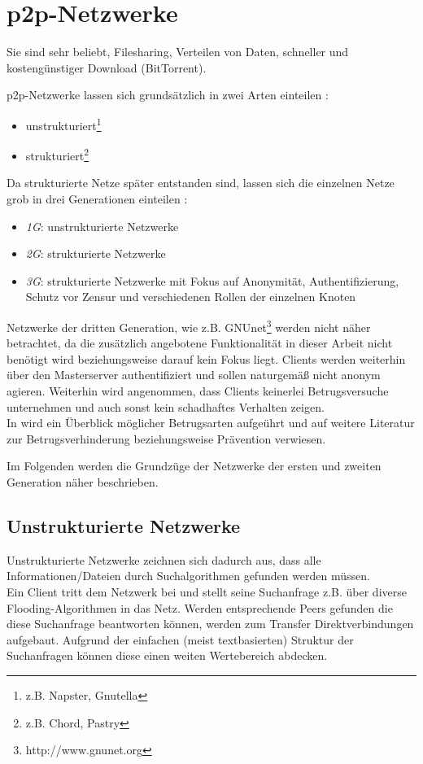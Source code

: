 \section{p2p-Netzwerke}
\label{chap:grundlagen:p2p}
Sie sind sehr beliebt, Filesharing, Verteilen von Daten, schneller und kostengünstiger Download (BitTorrent).

p2p-Netzwerke lassen sich grundsätzlich in zwei Arten einteilen \cite{Steinmetz2005, Lua2005Survey}: 
\begin{itemize}
\item unstrukturiert\footnote{z.B. Napster, Gnutella}
\item strukturiert\footnote{z.B. Chord, Pastry}
\end{itemize}

Da strukturierte Netze später entstanden sind, lassen sich die einzelnen Netze grob in drei Generationen einteilen \cite{Bo2003PeertoPeer}:
\begin{itemize}
	\item \emph{1G}: unstrukturierte Netzwerke
	\item \emph{2G}: strukturierte Netzwerke
	\item \emph{3G}: strukturierte Netzwerke mit Fokus auf Anonymität, Authentifizierung, Schutz vor Zensur und verschiedenen Rollen der einzelnen Knoten
\end{itemize}

Netzwerke der dritten Generation, wie z.B. GNUnet\footnote{http://www.gnunet.org} \cite{Grothoff2002GNET} werden nicht näher betrachtet, da die zusätzlich angebotene Funktionalität in dieser Arbeit nicht benötigt wird beziehungsweise darauf kein Fokus liegt. Clients werden weiterhin über den Masterserver authentifiziert und sollen naturgemäß nicht anonym agieren. Weiterhin wird angenommen, dass Clients keinerlei Betrugsversuche unternehmen und auch sonst kein schadhaftes Verhalten zeigen.\\
In  wird ein Überblick möglicher Betrugsarten aufgeührt und auf weitere Literatur zur Betrugsverhinderung beziehungsweise Prävention verwiesen.

Im Folgenden werden die Grundzüge der Netzwerke der ersten und zweiten Generation näher beschrieben.

\subsection{Unstrukturierte Netzwerke}
Unstrukturierte Netzwerke zeichnen sich dadurch aus, dass alle Informationen/Dateien durch Suchalgorithmen \cite{Lv2002} gefunden werden müssen. \\
Ein Client tritt dem Netzwerk bei und stellt seine Suchanfrage z.B. über diverse Flooding-Algorithmen in das Netz. Werden entsprechende Peers gefunden die diese Suchanfrage beantworten können, werden zum Transfer Direktverbindungen aufgebaut. Aufgrund der einfachen (meist textbasierten) Struktur der Suchanfragen können diese einen weiten Wertebereich abdecken.

